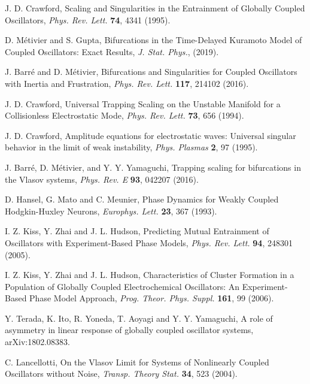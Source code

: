 \begin{thebibliography}{99}
  J. D. Crawford,
  Scaling and Singularities in the Entrainment of Globally Coupled Oscillators,
  {\it Phys. Rev. Lett.} {\bf 74}, 4341 (1995).

  D. M\'{e}tivier and S. Gupta,
  Bifurcations in the Time-Delayed Kuramoto Model of Coupled Oscillators: Exact Results,
  \textit{J. Stat. Phys.}, (2019).
  
  
  J. Barr\'{e} and D. M\'{e}tivier, Bifurcations and Singularities for Coupled Oscillators with Inertia and Frustration, \textit{Phys. Rev. Lett.} \textbf{117}, 214102 (2016).

  J. D. Crawford,
  Universal Trapping Scaling on the Unstable Manifold for a Collisionless Electrostatic Mode,
  {\it Phys. Rev. Lett.} {\bf 73}, 656 (1994).

  J. D. Crawford,
  Amplitude equations for electrostatic waves: Universal singular behavior in the limit of weak instability,
  {\it Phys. Plasmas} {\bf 2}, 97 (1995).

  J. Barr{\'e}, D. M{\'e}tivier, and Y. Y. Yamaguchi,
  Trapping scaling for bifurcations in the Vlasov systems,
  \textit{Phys. Rev. E} {\bf 93}, 042207 (2016).


  D. Hansel, G. Mato and C. Meunier,
  Phase Dynamics for Weakly Coupled Hodgkin-Huxley Neurons,
  \textit{Europhys. Lett.} {\bf 23}, 367 (1993).

  I. Z. Kiss, Y. Zhai and J. L. Hudson,
  Predicting Mutual Entrainment of Oscillators with Experiment-Based Phase Models,
  \textit{Phys. Rev. Lett.} {\bf 94}, 248301 (2005).

  I. Z. Kiss, Y. Zhai and J. L. Hudson,
  Characteristics of Cluster Formation in a Population of Globally Coupled Electrochemical Oscillators: An Experiment-Based Phase Model Approach,
  \textit{Prog. Theor. Phys. Suppl.} {\bf 161}, 99 (2006).



  Y. Terada, K. Ito, R. Yoneda, T. Aoyagi and Y. Y. Yamaguchi,
  A role of asymmetry in linear response of globally coupled oscillator systems,
  arXiv:1802.08383.

  C. Lancellotti, On the Vlasov Limit for Systems of Nonlinearly Coupled Oscillators without Noise, \textit{Transp. Theory Stat.} \textbf{34}, 523 (2004).



\end{thebibliography}
